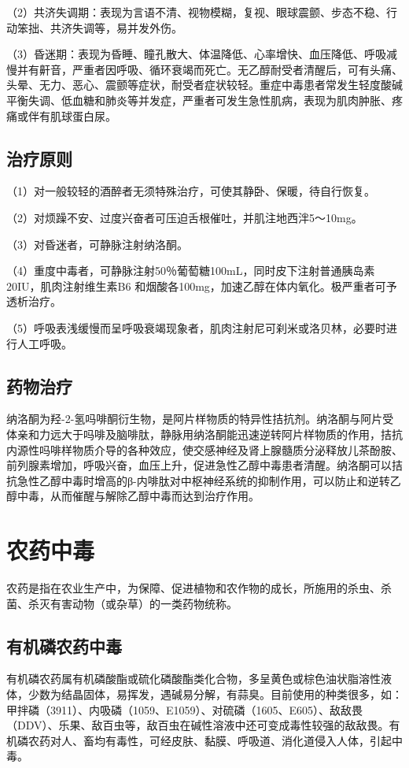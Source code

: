 （2）共济失调期：表现为言语不清、视物模糊，复视、眼球震颤、步态不稳、行动笨拙、共济失调等，易并发外伤。

（3）昏迷期：表现为昏睡、瞳孔散大、体温降低、心率增快、血压降低、呼吸减慢并有鼾音，严重者因呼吸、循环衰竭而死亡。无乙醇耐受者清醒后，可有头痛、头晕、无力、恶心、震颤等症状，耐受者症状较轻。重症中毒患者常发生轻度酸碱平衡失调、低血糖和肺炎等并发症，严重者可发生急性肌病，表现为肌肉肿胀、疼痛或伴有肌球蛋白尿。

\subsection{治疗原则}

（1）对一般较轻的酒醉者无须特殊治疗，可使其静卧、保暖，待自行恢复。

（2）对烦躁不安、过度兴奋者可压迫舌根催吐，并肌注地西泮5～10mg。

（3）对昏迷者，可静脉注射纳洛酮。

（4）重度中毒者，可静脉注射50％葡萄糖100mL，同时皮下注射普通胰岛素20IU，肌肉注射维生素B{6}
和烟酸各100mg，加速乙醇在体内氧化。极严重者可予透析治疗。

（5）呼吸表浅缓慢而呈呼吸衰竭现象者，肌肉注射尼可刹米或洛贝林，必要时进行人工呼吸。

\subsection{药物治疗}

纳洛酮为羟-2-氢吗啡酮衍生物，是阿片样物质的特异性拮抗剂。纳洛酮与阿片受体亲和力远大于吗啡及脑啡肽，静脉用纳洛酮能迅速逆转阿片样物质的作用，拮抗内源性吗啡样物质介导的各种效应，使交感神经及肾上腺髓质分泌释放儿茶酚胺、前列腺素增加，呼吸兴奋，血压上升，促进急性乙醇中毒患者清醒。纳洛酮可以拮抗急性乙醇中毒时增高的β-内啡肽对中枢神经系统的抑制作用，可以防止和逆转乙醇中毒，从而催醒与解除乙醇中毒而达到治疗作用。

\section{农药中毒}

农药是指在农业生产中，为保障、促进植物和农作物的成长，所施用的杀虫、杀菌、杀灭有害动物（或杂草）的一类药物统称。

\subsection{有机磷农药中毒}

有机磷农药属有机磷酸酯或硫化磷酸酯类化合物，多呈黄色或棕色油状脂溶性液体，少数为结晶固体，易挥发，遇碱易分解，有蒜臭。目前使用的种类很多，如：甲拌磷（3911）、内吸磷（1059、E1059）、对硫磷（1605、E605）、敌敌畏（DDV）、乐果、敌百虫等，敌百虫在碱性溶液中还可变成毒性较强的敌敌畏。有机磷农药对人、畜均有毒性，可经皮肤、黏膜、呼吸道、消化道侵入人体，引起中毒。

